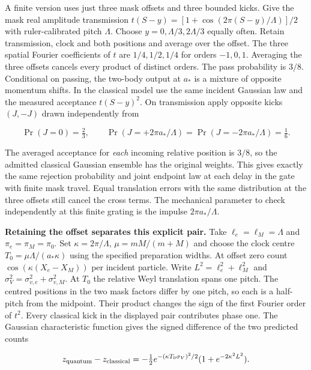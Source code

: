 \documentclass[11pt,a4paper]{article}
\begin{document}
A finite version uses just three mask offsets and three bounded kicks.
Give the mask real amplitude transmission
\(t(S-y)=[1+\cos(2\pi(S-y)/\Lambda)]/2\) with ruler-calibrated pitch
\(\Lambda\). Choose \(y=0,\Lambda/3,2\Lambda/3\) equally often. Retain
transmission, clock and both positions and average over the offset. The
three spatial Fourier coefficients of \(t\) are \(1/4,1/2,1/4\) for
orders \(-1,0,1\). Averaging the three offsets cancels every product of
distinct orders. The pass probability is \(3/8\). Conditional on
passing, the two-body output at \(a_*\) is a mixture of opposite
momentum shifts. In the classical model use the same incident Gaussian
law and the measured acceptance \(t(S-y)^2\). On transmission apply
opposite kicks \((J,-J)\) drawn independently from

\[
 \Pr(J=0)=\tfrac23,\qquad
 \Pr(J=+2\pi a_*/\Lambda)=\Pr(J=-2\pi a_*/\Lambda)=\tfrac16 .
\]

The averaged acceptance for \emph{each} incoming relative position is
\(3/8\), so the admitted classical Gaussian ensemble has the original
weights. This gives exactly the same rejection probability and joint
endpoint law at each delay in the gate with finite mask travel. Equal
translation errors with the same distribution at the three offsets still
cancel the cross terms. The mechanical parameter to check independently
at this finite grating is the impulse \(2\pi a_*/\Lambda\).

\textbf{Retaining the offset separates this explicit pair.} Take
\(\ell_e=\ell_M=\Lambda\) and \(\pi_e=\pi_M=\pi_0\). Set
\(\kappa=2\pi/\Lambda\), \(\mu=mM/(m+M)\) and choose the clock centre
\(T_0=\mu\Lambda/(a_*\kappa)\) using the specified preparation widths.
At offset zero count \(\cos(\kappa(X_e-X_M))\) per incident particle.
Write \(L^2=\ell_e^2+\ell_M^2\) and
\(\sigma_V^2=\sigma_{v,e}^2+\sigma_{v,M}^2\). At \(T_0\) the relative
Weyl translation spans one pitch. The centred positions in the two mask
factors differ by one pitch, so each is a half-pitch from the midpoint.
Their product changes the sign of the first Fourier order of \(t^2\).
Every classical kick in the displayed pair contributes phase one. The
Gaussian characteristic function gives the signed difference of the two
predicted counts

\[
 z_{\rm quantum}-z_{\rm classical}
 =-\tfrac12 e^{-(\kappa T_0\sigma_V)^2/2}
             (1+e^{-2\kappa^2L^2}) .
\]
\end{document}
